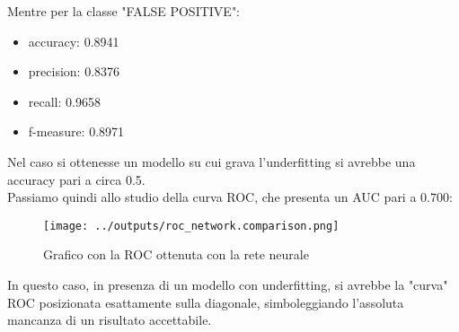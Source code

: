 Mentre per la classe "FALSE POSITIVE":
\begin{itemize}
    \item accuracy: 0.8941 
    \item precision: 0.8376  
    \item recall: 0.9658 
    \item f-measure: 0.8971
\end{itemize}
Nel caso si ottenesse un modello su cui grava l'underfitting si avrebbe una 
accuracy pari a circa 0.5.\\
Passiamo quindi allo studio della curva ROC, che presenta un AUC pari a $0.700$:
\begin{figure}[H]
    \centering
    \texttt{[image: ../outputs/roc\_network.comparison.png]}
    \caption{Grafico con la ROC ottenuta con la rete neurale}
\end{figure}
In questo caso, in presenza di un modello con underfitting, 
si avrebbe la "curva" ROC posizionata esattamente sulla diagonale, 
simboleggiando l'assoluta mancanza di un risultato accettabile.